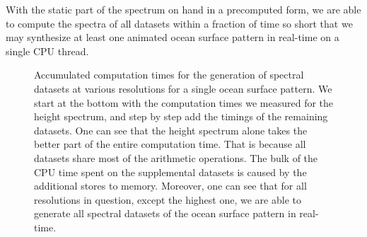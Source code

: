 With the static part of the spectrum on hand in a precomputed form, we are able
to compute the spectra of all datasets within a fraction of time so short that
we may synthesize at least one animated ocean surface pattern in real-time on
a single CPU thread.
%
%
\begin{figure}
\centering
\mydata
{}
\caption{
Accumulated computation times for the generation of spectral datasets at
various resolutions for a single ocean surface pattern.
We start at the bottom with the computation times we measured for the height
spectrum, and step by step add the timings of the remaining datasets.
One can see that the height spectrum alone takes the better
part of the entire computation time.
That is because all datasets share most of the arithmetic operations.
The bulk of the CPU time spent on the supplemental datasets is caused by the
additional stores to memory.
Moreover, one can see that for all resolutions in question, except the highest
one, we are able to generate all spectral datasets of the ocean surface pattern
in real-time.}
\label{fig:results:h}
\end{figure}
